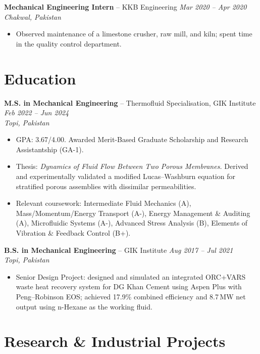 \documentclass[11pt,a4paper]{article}
\begin{document}
\vspace{4pt}
\textbf{Mechanical Engineering Intern} -- KKB Engineering
\hfill \textit{Mar 2020 -- Apr 2020}\\
\textit{Chakwal, Pakistan}
\begin{itemize}
  \item Observed maintenance of a limestone crusher, raw mill, and kiln; spent
        time in the quality control department.
\end{itemize}

\section{Education}

\textbf{M.S. in Mechanical Engineering} -- Thermofluid Specialisation, GIK
Institute \hfill \textit{Feb 2022 -- Jun 2024}\\
\textit{Topi, Pakistan}
\begin{itemize}
  \item GPA: 3.67/4.00. Awarded Merit-Based Graduate Scholarship and Research
        Assistantship (GA-1).
  \item Thesis: \textit{Dynamics of Fluid Flow Between Two Porous Membranes.}
        Derived and experimentally validated a modified Lucas--Washburn equation
        for stratified porous assemblies with dissimilar permeabilities.
  \item Relevant coursework: Intermediate Fluid Mechanics (A), Mass/Momentum/Energy
        Transport (A-), Energy Management \& Auditing (A), Microfluidic Systems
        (A-), Advanced Stress Analysis (B), Elements of Vibration \& Feedback
        Control (B+).
\end{itemize}

\vspace{4pt}
\textbf{B.S. in Mechanical Engineering} -- GIK Institute
\hfill \textit{Aug 2017 -- Jul 2021}\\
\textit{Topi, Pakistan}
\begin{itemize}
  \item Senior Design Project: designed and simulated an integrated ORC+VARS
        waste heat recovery system for DG Khan Cement using Aspen Plus with
        Peng--Robinson EOS; achieved 17.9\% combined efficiency and 8.7\,MW net
        output using n-Hexane as the working fluid.
\end{itemize}

\section{Research \& Industrial Projects}
\end{document}
